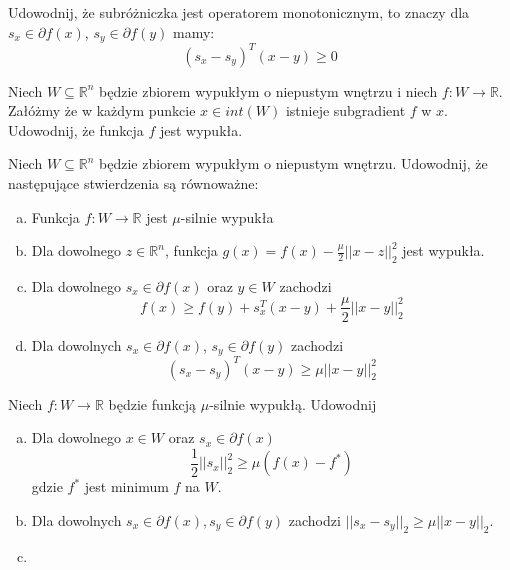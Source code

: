 \documentclass[10pt,a4paper,draft]{report}
\begin{document}
\begin{problem}
Udowodnij, że subróżniczka jest operatorem monotonicznym, to znaczy dla $s_x \in \partial f(x)$, $s_y \in \partial f(y)$ mamy:
\[
(s_x - s_y)^T (x - y) \geq 0
\]
\end{problem}

\begin{problem}
Niech $W \subseteq \mathbb{R}^n$ będzie zbiorem wypukłym o niepustym wnętrzu i niech $f : W \rightarrow \mathbb{R}$. Załóżmy że w każdym punkcie $x \in int(W)$ istnieje subgradient $f$ w $x$. Udowodnij, że funkcja $f$ jest wypukła.
\end{problem}

\begin{problem}
Niech $W \subseteq \mathbb{R}^n$ będzie zbiorem wypukłym o niepustym wnętrzu. Udowodnij, że następujące stwierdzenia są równoważne:
\begin{enumerate}[a)]
\item Funkcja $f: W \rightarrow \mathbb{R}$ jest $\mu$-silnie wypukła
\item Dla dowolnego $z \in \mathbb{R}^n$, funkcja $g(x) = f(x) - \frac{\mu}{2}||x-z||_2^2$ jest wypukła.
\item Dla dowolnego $s_x \in \partial f(x)$ oraz $y \in W$ zachodzi
\[
f(x) \geq f(y) + s_x^T(x - y) + \frac{\mu}{2} ||x-y||_2^2
\]
\item Dla dowolnych $s_x \in \partial f(x)$, $s_y \in \partial f(y)$ zachodzi
\[
(s_x - s_y)^T (x - y) \geq \mu ||x-y||_2^2
\]
\end{enumerate}
\end{problem}

\begin{problem}
Niech $f: W \rightarrow \mathbb{R}$ będzie funkcją $\mu$-silnie wypukłą. Udowodnij
\begin{enumerate}[a)]
\item Dla dowolnego $x \in W$ oraz $s_x \in \partial f(x)$ 
\[
\frac{1}{2} ||s_x||_2^2 \geq \mu (f(x) - f^*)
\]
gdzie $f^*$ jest minimum $f$ na $W$. 
\item Dla dowolnych $s_x \in \partial f(x), s_y \in \partial f(y)$ zachodzi $||s_x - s_y||_2 \geq \mu ||x-y||_2$.
\item 
\end{enumerate}

\end{problem}
\end{document}
